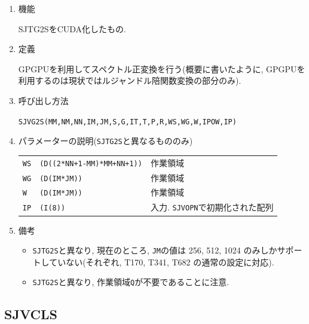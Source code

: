 \documentclass[a4j,fleqn]{jarticle}
\begin{document}
\begin{enumerate}

\item 機能

SJTG2SをCUDA化したもの.

\item 定義

GPGPUを利用してスペクトル正変換を行う(概要に書いたように, GPGPUを
利用するのは現状ではルジャンドル陪関数変換の部分のみ).

\item 呼び出し方法 

{\tt SJVG2S(MM,NM,NN,IM,JM,S,G,IT,T,P,R,WS,WG,W,IPOW,IP)}
  
\item パラメーターの説明({\tt SJTG2S}と異なるもののみ)

\begin{tabular}{lll}
{\tt WS} & {\tt (D((2*NN+1-MM)*MM+NN+1))} & 作業領域\\
{\tt WG}  & {\tt (D(IM*JM))} & 作業領域\\	
{\tt W}  & {\tt (D(IM*JM))} & 作業領域\\
{\tt IP}  & {\tt (I(8))} & 入力. {\tt SJVOPN}で初期化された配列
\end{tabular}

\item 備考

\begin{itemize}
\item {\tt SJTG2S}と異なり, 現在のところ, {\tt JM}の値は
256, 512, 1024 のみしかサポートしていない(それぞれ, 
T170, T341, T682 の通常の設定に対応).
\item {\tt SJTG2S}と異なり, 作業領域{\tt Q}が不要であることに注意.
\end{itemize}

\end{enumerate}


\subsection{SJVCLS}
\end{document}
